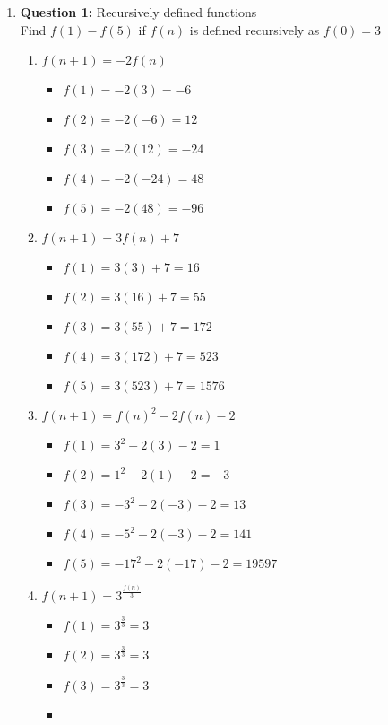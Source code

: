 \documentclass[11pt]{article}
\begin{document}
\begin{enumerate}
\item
\textbf{Question 1:} Recursively defined functions \\
Find $f(1)-f(5)$ if $f(n)$ is defined recursively as $f(0) = 3$
\begin{enumerate}[label=(\alph*)]
    \item
    $f(n+1) = -2f(n)$
    \begin{itemize}
        \item 
        $f(1)= -2(3) = -6$
        \item 
        $f(2) = -2(-6) = 12$
        \item 
        $f(3) = -2(12) = -24$
        \item 
        $f(4) = -2(-24) = 48$
        \item 
        $f(5) = -2(48) = -96$
    \end{itemize}
    \item 
    $f(n+1) = 3f(n)+7$
    \begin{itemize}
        \item 
        $f(1) = 3(3)+7 = 16$
        \item
        $f(2) = 3(16)+7 = 55$
        \item 
        $f(3) = 3(55)+7 = 172$
        \item
        $f(4) = 3(172)+7 = 523$
        \item 
        $f(5) = 3(523)+7 = 1576$
    \end{itemize}
    \item 
    $f(n+1) = f(n)^2-2f(n)-2$
    \begin{itemize}
        \item 
        $f(1) = 3^2-2(3)-2 = 1$
        \item 
        $f(2) = 1^2-2(1)-2 = -3$
        \item 
        $f(3) = -3^2-2(-3)-2 = 13$
        \item 
        $f(4) = -5^2-2(-3)-2 = 141$
        \item 
        $f(5) = -17^2-2(-17)-2 = 19597$
    \end{itemize}
    \item 
    $f(n+1)=3^\frac{f(n)}{3}$
    \begin{itemize}
        \item 
        $f(1) = 3^\frac{3}{3} = 3$
        \item 
        $f(2) = 3^\frac{3}{3} = 3$
        \item 
        $f(3) = 3^\frac{3}{3} = 3$
        \item 

\end{itemize}
\end{enumerate}
\end{enumerate}
\end{document}
